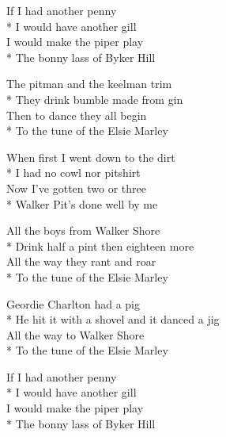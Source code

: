 

If I had another penny\\*
I would have another gill\\
I would make the piper play\\*
The bonny lass of Byker Hill


The pitman and the keelman trim\\*
They drink bumble made from gin\\
Then to dance they all begin\\*
To the tune of the Elsie Marley 

When first I went down to the dirt\\*
I had no cowl nor pitshirt\\
Now I've gotten two or three\\*
Walker Pit's done well by me 

All the boys from Walker Shore\\*
Drink half a pint then eighteen more\\
All the way they rant and roar\\*
To the tune of the Elsie Marley 

Geordie Charlton had a pig\\*
He hit it with a shovel and it danced a jig\\
All the way to Walker Shore\\*
To the tune of the Elsie Marley 

If I had another penny\\*
I would have another gill\\
I would make the piper play\\*
The bonny lass of Byker Hill 

